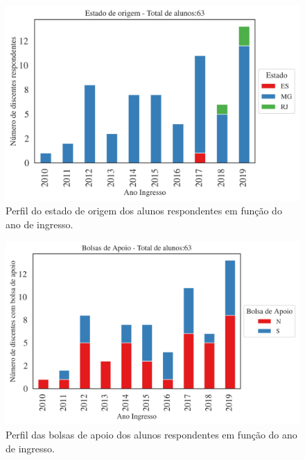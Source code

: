 \documentclass[a4paper,10pt]{article}
\begin{document}
\begin{figure}[h]
\centering
\includegraphics[width=0.85\linewidth]{quantitativos_estado_de_origem_1109475.png}
\caption{\label{fig:estado_ano} Perfil do estado de origem dos alunos respondentes em função do ano de ingresso.}
\end{figure}

\begin{figure}[h]
\centering
\includegraphics[width=0.85\linewidth]{quantitativos_bolsa_de_apoio_1109475.png}
\caption{\label{fig:bolsa_ano} Perfil das bolsas de apoio  dos alunos respondentes em função do ano de ingresso.}
\end{figure}
\end{document}
